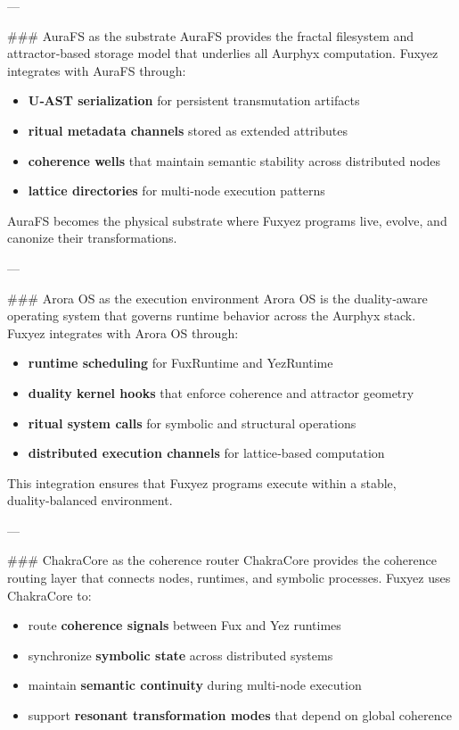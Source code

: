 \documentclass[12pt, a4paper]{book}
\begin{document}
---

\#\#\# AuraFS as the substrate  
AuraFS provides the fractal filesystem and attractor‑based storage model that underlies all Aurphyx computation. Fuxyez integrates with AuraFS through:

\begin{itemize}
  \item \textbf{U‑AST serialization} for persistent transmutation artifacts  
  \item \textbf{ritual metadata channels} stored as extended attributes  
  \item \textbf{coherence wells} that maintain semantic stability across distributed nodes  
  \item \textbf{lattice directories} for multi‑node execution patterns  
\end{itemize}

AuraFS becomes the physical substrate where Fuxyez programs live, evolve, and canonize their transformations.

---

\#\#\# Arora OS as the execution environment  
Arora OS is the duality‑aware operating system that governs runtime behavior across the Aurphyx stack. Fuxyez integrates with Arora OS through:

\begin{itemize}
  \item \textbf{runtime scheduling} for FuxRuntime and YezRuntime  
  \item \textbf{duality kernel hooks} that enforce coherence and attractor geometry  
  \item \textbf{ritual system calls} for symbolic and structural operations  
  \item \textbf{distributed execution channels} for lattice‑based computation  
\end{itemize}

This integration ensures that Fuxyez programs execute within a stable, duality‑balanced environment.

---

\#\#\# ChakraCore as the coherence router  
ChakraCore provides the coherence routing layer that connects nodes, runtimes, and symbolic processes. Fuxyez uses ChakraCore to:

\begin{itemize}
  \item route \textbf{coherence signals} between Fux and Yez runtimes  
  \item synchronize \textbf{symbolic state} across distributed systems  
  \item maintain \textbf{semantic continuity} during multi‑node execution  
  \item support \textbf{resonant transformation modes} that depend on global coherence  
\end{itemize}
\end{document}
